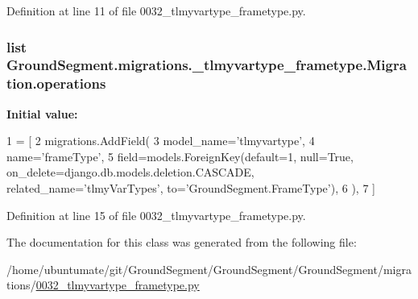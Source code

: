 Definition at line 11 of file 0032\+\_\+tlmyvartype\+\_\+frametype.\+py.

\hypertarget{class_ground_segment_1_1migrations_1_10032__tlmyvartype__frametype_1_1_migration_ae32cc0c05a0d7419a9df3d56668f7eb3}{}
\subsubsection[{operations}]{\setlength{\rightskip}{0pt plus 5cm}list Ground\+Segment.\+migrations.\+\_\+tlmyvartype\+\_\+frametype.\+Migration.\+operations\hspace{0.3cm}{\ttfamily [static]}}\label{class_ground_segment_1_1migrations_1_10032__tlmyvartype__frametype_1_1_migration_ae32cc0c05a0d7419a9df3d56668f7eb3}
{\bfseries Initial value\+:}
\begin{DoxyCode}
1 = [
2         migrations.AddField(
3             model\_name=\textcolor{stringliteral}{'tlmyvartype'},
4             name=\textcolor{stringliteral}{'frameType'},
5             field=models.ForeignKey(default=1, null=\textcolor{keyword}{True}, on\_delete=django.db.models.deletion.CASCADE, 
      related\_name=\textcolor{stringliteral}{'tlmyVarTypes'}, to=\textcolor{stringliteral}{'GroundSegment.FrameType'}),
6         ),
7     ]
\end{DoxyCode}


Definition at line 15 of file 0032\+\_\+tlmyvartype\+\_\+frametype.\+py.



The documentation for this class was generated from the following file\+:\begin{DoxyCompactItemize}
\item 
/home/ubuntumate/git/\+Ground\+Segment/\+Ground\+Segment/\+Ground\+Segment/migrations/\hyperlink{0032__tlmyvartype__frametype_8py}{0032\+\_\+tlmyvartype\+\_\+frametype.\+py}\end{DoxyCompactItemize}
